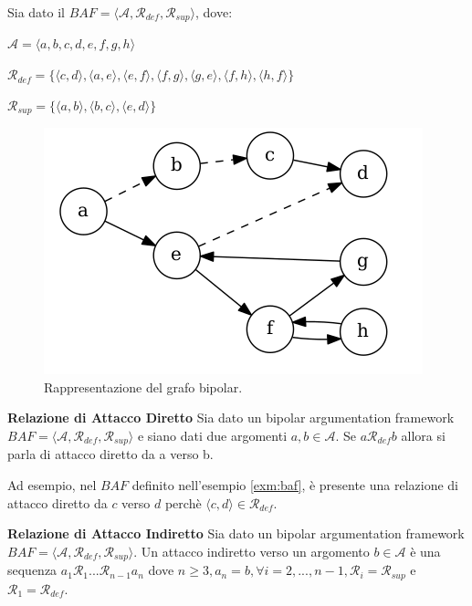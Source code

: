 \bigskip
\begin{exmp}
    Sia dato il $BAF  = ⟨\mathcal{A}, \mathcal{R}_{def}, \mathcal{R}_{sup}⟩$, dove:
    \begin{center}
        $\mathcal{A} = ⟨a, b, c, d, e, f, g, h⟩$
        
        $\mathcal{R}_{def} = \{⟨c, d⟩, ⟨a, e⟩, ⟨e, f⟩, ⟨f, g⟩, ⟨g, e⟩, ⟨f, h⟩, ⟨h, f⟩\}$
        
        $\mathcal{R}_{sup} = \{⟨a, b⟩, ⟨b, c⟩, ⟨e, d⟩\}$
    \end{center}
    
    \begin{figure}
      \includegraphics[width=\linewidth]{Immagini/example-baf-graph.png}
      \caption{Rappresentazione del grafo bipolar.}
      \label{fig:baf-graph1}
    \end{figure}
    
    \label{exm:baf}
\end{exmp}

\bigskip
\begin{defn} \textbf{Relazione di Attacco Diretto} 
Sia dato un bipolar argumentation framework $BAF = ⟨\mathcal{A}, \mathcal{R}_{def}, \mathcal{R}_{sup}⟩$ e siano dati due argomenti $a, b ∈ \mathcal{A}$. Se $ a \mathcal{R}_{def} b$ allora si parla di attacco diretto da a verso b.
\label{defn:adbaf}
\end{defn}

Ad esempio, nel $BAF$ definito nell'esempio \ref{exm:baf}, è presente una relazione di attacco diretto da $c$ verso $d$ perchè $⟨c, d⟩ ∈ \mathcal{R}_{def}$.


\bigskip
\begin{defn} \textbf{Relazione di Attacco Indiretto} 
Sia dato un bipolar argumentation framework $BAF = ⟨\mathcal{A}, \mathcal{R}_{def}, \mathcal{R}_{sup}⟩$. Un attacco indiretto verso un argomento $b ∈ \mathcal{A}$ è una sequenza $a_{1}\mathcal{R}_{1}...\mathcal{R}_{n-1}a_{n}$ dove $n \geq 3, a_n = b, \forall i = 2, ..., n-1, \mathcal{R}_i = \mathcal{R}_{sup}$ e $ \mathcal{R}_{1} = \mathcal{R}_{def}$.
\label{defn:aibaf}
\end{defn}

